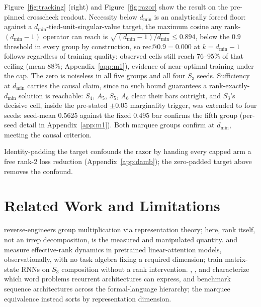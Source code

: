 \documentclass[mlabstract,onecolumn]{jmlr}
\makeatletter
\newcommand{\dmin}{d_{\min}}
\newcommand{\recninety}{\mathrm{rec}@0.9}
\makeatother
\begin{document}
Figure~\ref{fig:tracking} (right) and Figure~\ref{fig:razor} show the result on the
pre-pinned crosscheck readout. Necessity below $\dmin$ is an analytically
forced floor: against a $\dmin$-tied-unit-singular-value target, the
maximum cosine any rank-$(\dmin{-}1)$ operator can reach is
$\sqrt{(\dmin{-}1)/\dmin} \le 0.894$, below the $0.9$ threshold in every
group by construction, so $\recninety = 0.000$ at $k = \dmin{-}1$ follows
regardless of training quality; observed cells still reach 76--95\% of
that ceiling (mean 88\%; Appendix~\ref{app:m1}), evidence of
near-optimal training under the cap.
The zero is noiseless in all five groups
and all four $S_3$ seeds.
Sufficiency at $\dmin$ carries the causal claim, since no such bound
guarantees a rank-exactly-$\dmin$ solution is reachable: $S_4$, $A_5$,
$S_5$, $A_6$ clear their bars outright,
and $S_3$'s decisive cell, inside the pre-stated $\pm 0.05$ marginality
trigger, was extended to four seeds: seed-mean 0.5625 against the fixed
0.495 bar confirms the fifth group (per-seed detail in
Appendix~\ref{app:m1}).
Both marquee groups confirm at $\dmin$, meeting the causal criterion.

Identity-padding the target confounds the razor by handing every capped
arm a free rank-2 loss reduction (Appendix~\ref{app:damb});
the zero-padded target above removes the confound.

\section{Related Work and Limitations}
\label{sec:related}

\citet{chughtai2023universality} reverse-engineers group multiplication
via representation theory; here, rank itself, not an irrep decomposition,
is the measured and manipulated quantity.
\citet{nazari2026rank} and \citet{sun2026staterank} measure
effective-rank dynamics in pretrained linear-attention models,
observationally, with no task algebra fixing a required dimension;
\citet{mishra2026m2rnn} train matrix-state RNNs on $S_3$ composition
without a rank intervention. \citet{grazzi2025negative},
\citet{siems2025deltaproduct}, and \citet{merrill2024illusion}
characterize which word problems recurrent architectures can express,
and \citet{deletang2023chomsky} benchmark sequence architectures across
the formal-language hierarchy; the marquee equivalence instead sorts by
representation dimension.
\end{document}
